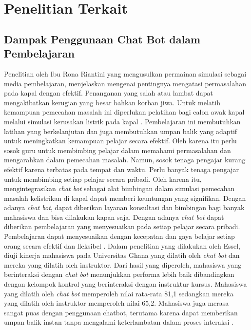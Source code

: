 \section{Penelitian Terkait}
\label{sec:penelitianterkait}

\subsection{Dampak Penggunaan Chat Bot dalam Pembelajaran}
Penelitian oleh Ibu Rona Riantini yang mengusulkan permainan simulasi sebagai media pembelajaran, menjelaskan mengenai pentingnya mengatasi permasalahan pada kapal dengan efektif. Penanganan yang salah atau lambat dapat mengakibatkan kerugian yang besar bahkan korban jiwa. Untuk melatih kemampuan pemecahan masalah ini diperlukan pelatihan bagi calon awak kapal melalui simulasi kerusakan listrik pada kapal \cite{riantini2022serious}. Pembelajaran ini membutuhkan latihan yang berkelanjutan dan juga membutuhkan umpan balik yang adaptif untuk meningkatkan kemampuan pelajar secara  efektif. Oleh karena itu perlu sosok guru untuk membimbing pelajar dalam memahami permasalahan dan mengarahkan dalam pemecahan masalah. Namun, sosok tenaga pengajar kurang efektif karena terbatas pada tempat dan waktu. Perlu banyak tenaga pengajar untuk membimbing setiap pelajar secara pribadi. Oleh karena itu, mengintegrasikan \emph{chat bot} sebagai alat bimbingan dalam simulasi pemecahan masalah kelistrikan di kapal dapat memberi keuntungan yang signifikan. Dengan adanya \emph{chat bot}, dapat diberikan layanan konsultasi dan bimbingan bagi banyak mahasiswa dan bisa dilakukan kapan saja. Dengan adanya \emph{chat bot} dapat diberikan pembelajaran yang menyesuaikan pada setiap pelajar secara pribadi. Pembelajaran dapat menyesuaikan dengan kecepatan dan gaya belajar setiap orang secara efektif dan fleksibel \cite{vazquezcano2021chatbot,kumar2021educational}. Dalam penelitian yang dilakukan oleh Essel, diuji kinerja mahasiswa pada Universitas Ghana yang dilatih oleh \emph{chat bot} dan mereka yang dilatih  oleh instruktor. Dari hasil yang diperoleh,  mahasiswa yang berinteraksi dengan \emph{chat bot} menunjukkan performa lebih baik dibandingkan dengan kelompok kontrol yang berinteraksi dengan instruktur kursus. Mahasiswa yang dilatih oleh \emph{chat bot} memperoleh nilai rata-rata 81,1 sedangkan mereka yang dilatih oleh instruktor memperoleh nilai 65,2. Mahasiswa juga merasa sangat puas dengan penggunaan chatbot, terutama karena dapat memberikan umpan balik instan tanpa mengalami keterlambatan dalam proses interaksi \cite{essel2022virtual}.

